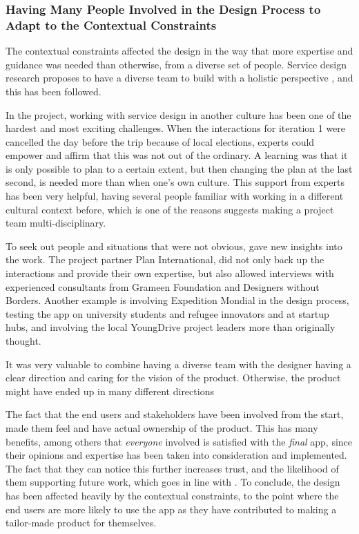  \subsubsection{Having Many People Involved in the Design Process to Adapt to the Contextual Constraints}

  The contextual constraints affected the design in the way that more expertise and guidance was needed than otherwise, from a diverse set of people. Service design research proposes to have a diverse team to build with a holistic perspective \citep{stickdorn}, and this has been followed.

  In the project, working with service design in another culture has been one of the hardest and most exciting challenges. When the interactions for iteration 1 were cancelled the day before the trip because of local elections, experts could empower and affirm that this was not out of the ordinary. A learning was that it is only possible to plan to a certain extent, but then changing the plan at the last second, is needed more than when one's own culture. This support from experts has been very helpful, having several people familiar with working in a different cultural context before, which is one of the reasons \cite{stickdorn} suggests making a project team multi-disciplinary. %

  To seek out people and situations that were not obvious, gave new insights into the work.  The project partner Plan International, did not only back up the interactions and provide their own expertise, but also allowed interviews with experienced consultants from Grameen Foundation and Designers without Borders. Another example is involving Expedition Mondial in the design process, testing the app on university students and refugee innovators and at startup hubs, and involving the local YoungDrive project leaders more than originally thought.

  It was very valuable to combine having a diverse team with the designer having a clear direction and caring for the vision of the product. Otherwise, the product might have ended up in many different directions

  The fact that the end users and stakeholders have been involved from the start, made them feel and have actual ownership of the product. This has many benefits, among others that \textit{everyone} involved is satisfied with the \textit{final} app, since their opinions and expertise has been taken into consideration and implemented. The fact that they can notice this further increases trust, and the likelihood of them supporting future work, which goes in line with \cite{stickdorn}. To conclude, the design has been affected heavily by the contextual constraints, to the point where the end users are more likely to use the app as they have contributed to making a tailor-made product for themselves.

